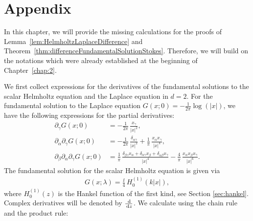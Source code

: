\chapter*{Appendix}
\label{chap:app}

In this chapter, we will provide the missing calculations for the proofs of Lemma~\ref{lem:HelmholtzLaplaceDifference} and Theorem~\ref{thm:differenceFundamentalSolutionStokes}.
Therefore, we will build on the notations which were already established at the beginning of Chapter~\ref{chap:2}.

We first collect expressions for the derivatives of the fundamental solutions to the scalar Helmholtz equation and the Laplace equation in $d= 2$.
For the fundamental solution to the Laplace equation $G(x; 0) = -\frac{1}{2\pi} \log(|x|)$, we have the following expressions for the partial derivatives:
\begin{align*}
  \partial_\gamma G(x; 0) &= -\frac{1}{2\pi} \, \frac{x_\gamma}{|x|^2}, \\[0.5em]
  \partial_\alpha \partial_\gamma G(x; 0) &= -\frac{1}{2\pi}\, \frac{\delta_{\alpha\gamma}}{|x|^2} + \frac{1}{\pi} \, \frac{x_\alpha x_\gamma}{|x|^4}, \\[0.5em]
  \partial_\beta \partial_\alpha \partial_\gamma G(x; 0)
  &= \frac{1}{\pi} \, \frac{\delta_{\beta \gamma} x_\alpha + \delta_{\alpha \gamma} x_\beta + \delta_{\alpha\beta} x_\gamma}{|x|^4} - \frac{4}{\pi}\, \frac{x_\alpha x_\beta x_\gamma}{|x|^6}.
\end{align*}
The fundamental solution for the scalar Helmholtz equation is given via 
\begin{align*}
  G(x; \lambda) = \frac{\ii}{4}\, H_0^{(1)}(k|x|),
\end{align*}
where $H_0^{(1)}(z)$ is the Hankel function of the first kind, see Section \ref{sec:hankel}.
Complex derivatives will be denoted by $\frac{\, {\operatorname{d}\!{}}}{\, {\operatorname{d}\!{z}}}$.
We calculate using the chain rule and the product rule:
